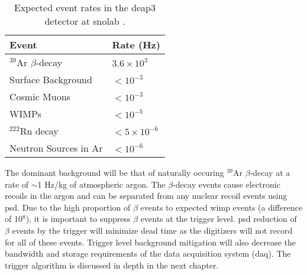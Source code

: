 \begin{table}
\centering
\caption{Expected event rates in the \gls{deap3} detector at \gls{snolab} \cite{DEAP3atSNOLAB2012}.}
\begin{tabular}{l	l}
\hline
\hline
Event&										Rate (Hz)\\ 	
\hline	
$^{39}$Ar $\beta$-decay&					{$3.6 \times 10 ^{3}$}\\
Surface Background&							$< 10^{-3}$\\
Cosmic Muons&								$< 10^{-3}$\\
{WIMPs}&									{$< 10^{-5}$}\\
$^{222}$Rn decay&							$< 5 \times 10^{-6}$\\
Neutron Sources in Ar&						$< 10^{-6}$\\
\hline
\hline
\end{tabular}
\label{Table:backgrounds}
\end{table}


The dominant background will be that of naturally occuring $^{39}$Ar $\beta$-decay at a rate of $\sim$1 Hz/kg of atmospheric argon. The $\beta$-decay events cause electronic recoils in the argon and can be separated from any nuclear recoil events using \gls{psd}. Due to the high proportion of $\beta$ events to expected \gls{wimp} events (a difference of 10$^8$), it is important to suppress $\beta$ events at the trigger level. \gls{psd} reduction of $\beta$ events by the trigger will minimize dead time as the digitizers will not record for all of these events. Trigger level background mitigation will also decrease the bandwidth and storage requirements of the data acquisition system (\gls{daq}). The trigger algorithm is discussed in depth in the next chapter.